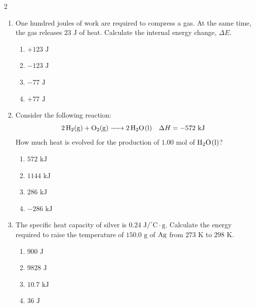 \documentclass[12pt,letterpaper]{article}
\begin{document}
\begin{multicols*}{2}
\begin{enumerate}
        \item One hundred joules of work are required to compress a gas. At the same time, the gas releases $23\text{ J}$ of heat. Calculate the internal energy change, $\Delta E$. %
            \begin{enumerate}
                \item $+123\text{ J}$
                \item $-123\text{ J}$
                \item $-77\text{ J}$
                \item $+77\text{ J}$
            \end{enumerate}
        \columnbreak
        \item Consider the following reaction:
            \begin{equation*}
                \ce{2H2(g) + O2(g) -> 2H2O(l)} \quad \Delta H = -572\text{ kJ}
            \end{equation*}
            How much heat is evolved for the production of $1.00\text{ mol}$ of $\ce{H2O(l)}$? %
            \begin{enumerate}
                \item $572\text{ kJ}$
                \item $1144\text{ kJ}$
                \item $286\text{ kJ}$
                \item $-286\text{ kJ}$
            \end{enumerate}

        \item The specific heat capacity of silver is $0.24\text{ J/}^\circ\text{C}\cdot\text{g}$. Calculate the energy required to raise the temperature of $150.0\text{ g}$ of $\ce{Ag}$ from $273\text{ K}$ to $298\text{ K}$. %
            \begin{enumerate}
                \item $900\text{ J}$
                \item $9828\text{ J}$
                \item $10.7\text{ kJ}$
                \item $36\text{ J}$
            \end{enumerate}


\end{enumerate}
\end{multicols*}
\end{document}
